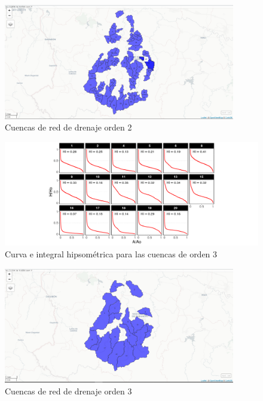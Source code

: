 \documentclass[11pt,]{article}
\begin{document}
\begin{figure}
\centering
\includegraphics[width=0.90000\textwidth]{Mapview_hypsobasinorder2.png}
\caption{Cuencas de red de drenaje orden 2\label{hypb2}}
\end{figure}

\begin{figure}
\centering
\includegraphics[width=1.00000\textwidth]{HypsoBasinOrder3.png}
\caption{Curva e integral hipsométrica para las cuencas de orden
3\label{hysob3}}
\end{figure}

\begin{figure}
\centering
\includegraphics[width=0.90000\textwidth]{Mapview_hypsobasinorder3.png}
\caption{Cuencas de red de drenaje orden 3\label{hypb3}}
\end{figure}
\end{document}
